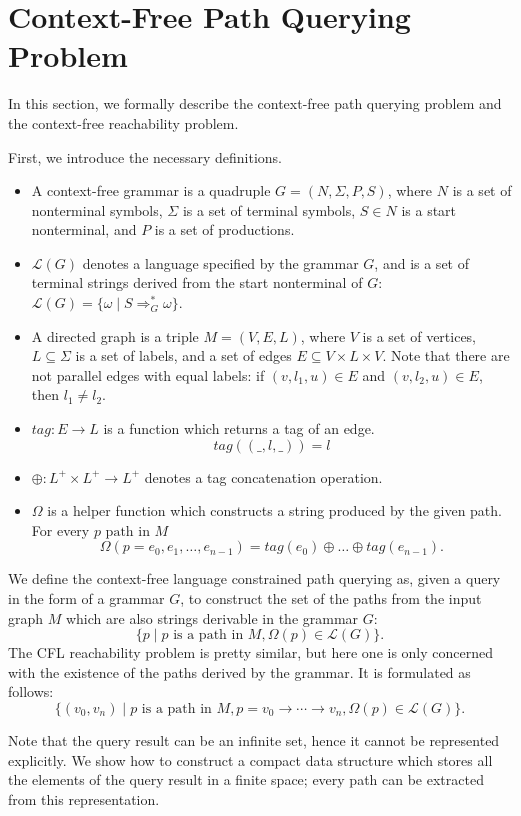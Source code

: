 \section{Context-Free Path Querying Problem}
\label{sec:CFPQ}

In this section, we formally describe the context-free path querying problem and the context-free reachability problem.

First, we introduce the necessary definitions.
\begin{itemize}
  \item A context-free grammar is a quadruple $G=(N, \Sigma, P, S)$, where $N$ is a set of nonterminal symbols, $\Sigma$ is a set of terminal symbols, $S \in N$ is a start nonterminal, and $P$ is a set of productions.
  \item $\mathcal{L}(G)$ denotes a language specified by the grammar $G$, and is a set of terminal strings derived from the start nonterminal of $G$: $\mathcal{L}(G) = \{\omega \mid S \Rightarrow_{G}^{*} \omega\}$.
  \item A directed graph is a triple $M = (V,E,L)$, where $V$ is a set of vertices, $L \subseteq \Sigma$ is a set of labels, and a set of edges $E\subseteq V\times L\times V$.
  Note that there are not parallel edges with equal labels: if $(v, l_1, u) \in E$ and $(v,l_2,u) \in E$, then $l_1 \neq l_2$.
  \item $tag: E \rightarrow L$ is a function which returns a tag of an edge. $$tag((\_,l,\_)) = l$$
  \item $\oplus: L^+ \times L^+ \rightarrow L^+$ denotes a tag concatenation operation.
  \item $\Omega$ is a helper function which constructs a string produced by the given path. For every $p \text{ path in } M$
  $$ \Omega(p = e_{0},e_{1},\dots,e_{n-1}) = tag (e_{0}) \oplus \dots \oplus tag (e_{n-1}).$$
\end{itemize}

We define the context-free language constrained path querying as, given a query in the form of a grammar $G$, to construct the set of the paths from the input graph $M$ which are also strings derivable in the grammar $G$: $$\{p \mid p \text{ is a path in } M, \Omega(p) \in \mathcal{L}(G)\}.$$
The CFL reachability problem is pretty similar, but here one is only concerned with the existence of the paths derived by the grammar. It is formulated as follows: $$\{ (v_0,v_n) \mid p \text{ is a path in } M, p = v_0 \rightarrow \cdots \rightarrow v_n, \Omega(p) \in \mathcal{L}(G)\}.$$

Note that the query result can be an infinite set, hence it cannot be represented explicitly.
We show how to construct a compact data structure which stores all the elements of the query result in a finite space; every path can be extracted from this representation.